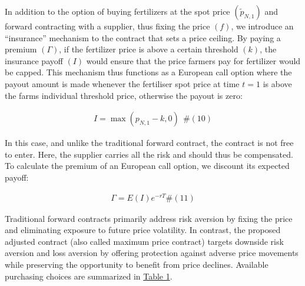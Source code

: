 \documentclass[
]{article}
\begin{document}
In addition to the option of buying fertilizers at the spot price
\(\left( {\widetilde{p}}_{N,1} \right)\) and forward contracting with a
supplier, thus fixing the price \((f)\), we introduce an ``insurance''
mechanism to the contract that sets a price ceiling. By paying a premium
\((\Gamma)\), if the fertilizer price is above a certain threshold
\((k)\), the insurance payoff \((I)\) would ensure that the price
farmers pay for fertilizer would be capped. This mechanism thus
functions as a European call option where the payout amount is made
whenever the fertiliser spot price at time \(t = 1\) is above the
farm\textquotesingle s individual threshold price, otherwise the payout
is zero:

\[\begin{array}{r}
I = \max{(p_{N,1} - k,0)}\ \ \#(10)
\end{array}\]

In this case, and unlike the traditional forward contract, the contract
is not free to enter. Here, the supplier carries all the risk and should
thus be compensated. To calculate the premium of an European call
option, we discount its expected payoff:

\[\begin{array}{r}
\Gamma = E(I)e^{- rT}\#(11)
\end{array}\]

\protect{}\label{_Ref205816026}{}Traditional forward
contracts primarily address risk aversion by fixing the price and
eliminating exposure to future price volatility. In contrast, the
proposed adjusted contract (also called maximum price contract) targets
downside risk aversion and loss aversion by offering protection against
adverse price movements while preserving the opportunity to benefit from
price declines. Available purchasing choices are summarized in
\hyperref[_Ref205816026]{Table 1}.
\end{document}
